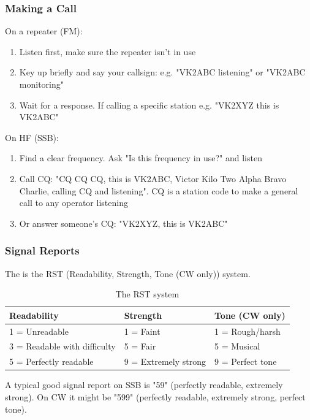 \documentclass{article}
\begin{document}
\subsubsection{Making a Call}
On a repeater (FM):
\begin{enumerate}
    \item Listen first, make sure the repeater isn't in use
    \item Key up briefly and say your callsign: e.g. "VK2ABC listening" or "VK2ABC monitoring"
    \item Wait for a response. If calling a specific station e.g. "VK2XYZ this is VK2ABC"
\end{enumerate}

On HF (SSB):
\begin{enumerate}
    \item Find a clear frequency. Ask "Is this frequency in use?" and listen
    \item Call CQ: "CQ CQ CQ, this is VK2ABC, Victor Kilo Two Alpha Bravo Charlie, calling CQ and listening". CQ is a station code to make a general call to any operator listening
    \item Or answer someone's CQ: "VK2XYZ, this is VK2ABC"
\end{enumerate}

\subsubsection{Signal Reports}
The is the RST (Readability, Strength, Tone (CW only)) system.
\begin{table}[h]
    \centering
    \caption{The RST system}
    \label{tab:13}
    \begin{tabular}{l|l|l}
        Readability & Strength & Tone (CW only) \\
        \hline
        \hline
        1 = Unreadable & 1 = Faint & 1 = Rough/harsh \\
        3 = Readable with difficulty & 5 = Fair & 5 = Musical \\
        5 = Perfectly readable & 9 = Extremely strong & 9 = Perfect tone
    \end{tabular}
\end{table}
A typical good signal report on SSB is "59" (perfectly readable, extremely strong). On CW it might be "599" (perfectly readable, extremely strong, perfect tone).
\end{document}
